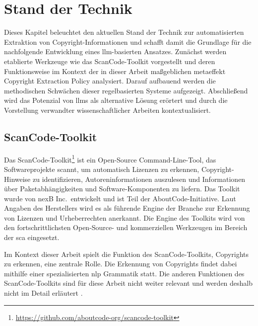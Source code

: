 \chapter{Stand der Technik}\label{ch:stand-der-technik}

Dieses Kapitel beleuchtet den aktuellen Stand der Technik zur automatisierten Extraktion von Copyright-Informationen und schafft damit die Grundlage für die nachfolgende Entwicklung eines \gls{llm}-basierten Ansatzes.
Zunächst werden etablierte Werkzeuge wie das ScanCode-Toolkit vorgestellt und deren Funktionsweise im Kontext der in dieser Arbeit maßgeblichen metaeffekt Copyright Extraction Policy analysiert.
Darauf aufbauend werden die methodischen Schwächen dieser regelbasierten Systeme aufgezeigt.
Abschließend wird das Potenzial von \glspl{llm} als alternative Lösung erörtert und durch die Vorstellung verwandter wissenschaftlicher Arbeiten kontextualisiert.


\section{ScanCode-Toolkit}\label{sec:scancode-toolkit}

Das ScanCode-Toolkit\footnote{\url{https://github.com/aboutcode-org/scancode-toolkit}} ist ein Open-Source Command-Line-Tool, das Softwareprojekte scannt, um automatisch Lizenzen zu erkennen, Copyright-Hinweise zu identifizieren, Autoreninformationen auszulesen und Informationen über Paketabhängigkeiten und Software-Komponenten zu liefern.
Das Toolkit wurde von nexB Inc.\ entwickelt und ist Teil der AboutCode-Initiative.
Laut Angaben des Herstellers wird es als führende Engine der Branche zur Erkennung von Lizenzen und Urheberrechten anerkannt.
Die Engine des Toolkits wird von den fortschrittlichsten Open-Source- und kommerziellen Werkzeugen im Bereich der \gls{sca} eingesetzt.

Im Kontext dieser Arbeit spielt die Funktion des ScanCode-Toolkits, Copyrights zu erkennen, eine zentrale Rolle.
Die Erkennung von Copyrights findet dabei mithilfe einer spezialisierten \gls{nlp} Grammatik statt.
Die anderen Funktionen des ScanCode-Toolkits sind für diese Arbeit nicht weiter relevant und werden deshalb nicht im Detail erläutert \autocite{noauthor_scancode-toolkit-documentation_nodate}.


